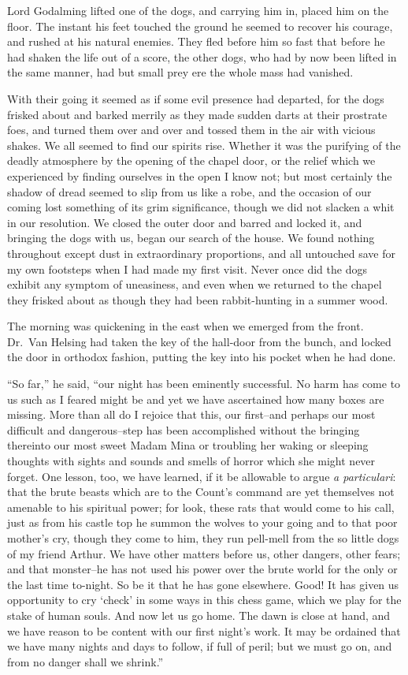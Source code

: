 \documentclass[12pt,openright]{book}
\begin{document}
Lord Godalming lifted one of the dogs, and carrying him in, placed him on the floor. The instant his feet touched the ground he seemed to recover his courage, and rushed at his natural enemies. They fled before him so fast that before he had shaken the life out of a score, the other dogs, who had by now been lifted in the same manner, had but small prey ere the whole mass had vanished.

With their going it seemed as if some evil presence had departed, for the dogs frisked about and barked merrily as they made sudden darts at their prostrate foes, and turned them over and over and tossed them in the air with vicious shakes. We all seemed to find our spirits rise. Whether it was the purifying of the deadly atmosphere by the opening of the chapel door, or the relief which we experienced by finding ourselves in the open I know not; but most certainly the shadow of dread seemed to slip from us like a robe, and the occasion of our coming lost something of its grim significance, though we did not slacken a whit in our resolution. We closed the outer door and barred and locked it, and bringing the dogs with us, began our search of the house. We found nothing throughout except dust in extraordinary proportions, and all untouched save for my own footsteps when I had made my first visit. Never once did the dogs exhibit any symptom of uneasiness, and even when we returned to the chapel they frisked about as though they had been rabbit-hunting in a summer wood.

The morning was quickening in the east when we emerged from the front. Dr. Van Helsing had taken the key of the hall-door from the bunch, and locked the door in orthodox fashion, putting the key into his pocket when he had done.

“So far,” he said, “our night has been eminently successful. No harm has come to us such as I feared might be and yet we have ascertained how many boxes are missing. More than all do I rejoice that this, our first–and perhaps our most difficult and dangerous–step has been accomplished without the bringing thereinto our most sweet Madam Mina or troubling her waking or sleeping thoughts with sights and sounds and smells of horror which she might never forget. One lesson, too, we have learned, if it be allowable to argue \textit{a particulari}: that the brute beasts which are to the Count’s command are yet themselves not amenable to his spiritual power; for look, these rats that would come to his call, just as from his castle top he summon the wolves to your going and to that poor mother’s cry, though they come to him, they run pell-mell from the so little dogs of my friend Arthur. We have other matters before us, other dangers, other fears; and that monster–he has not used his power over the brute world for the only or the last time to-night. So be it that he has gone elsewhere. Good! It has given us opportunity to cry ‘check’ in some ways in this chess game, which we play for the stake of human souls. And now let us go home. The dawn is close at hand, and we have reason to be content with our first night’s work. It may be ordained that we have many nights and days to follow, if full of peril; but we must go on, and from no danger shall we shrink.”
\end{document}
